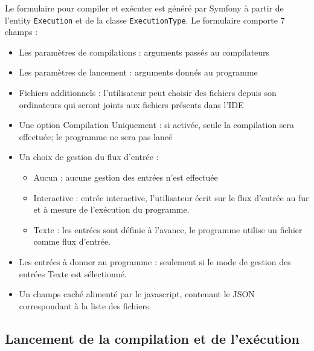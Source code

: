 Le formulaire pour compiler et exécuter est généré par Symfony à partir de l'entity \texttt{Execution} et de la classe \texttt{ExecutionType}. Le formulaire comporte 7 champs :
\begin{itemize}
  \item Les paramètres de compilations : arguments passés au compilateurs
  \item Les paramètres de lancement : arguments donnés au programme
  \item Fichiers additionnels : l'utilisateur peut choisir des fichiers depuis son ordinateurs qui seront joints aux fichiers présents dans l'IDE
  \item Une option Compilation Uniquement : si activée, seule la compilation sera effectuée; le programme ne sera pas lancé
  \item{ Un choix de gestion du flux d'entrée :
  \begin{itemize}
    \item Aucun : aucune gestion des entrées n'est effectuée
    \item Interactive : entrée interactive, l'utilisateur écrit sur le flux d'entrée au fur et à mesure de l'exécution du programme.
    \item Texte : les entrées sont définie à l'avance, le programme utilise un fichier comme flux d'entrée.
  \end{itemize}}
  \item Les entrées à donner au programme : seulement si le mode de gestion des entrées Texte est sélectionné.
  \item Un champs caché alimenté par le javascript, contenant le JSON correspondant à la liste des fichiers.
\end{itemize}

\subsection{Lancement de la compilation et de l'exécution}


